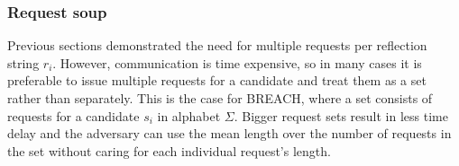 \subsubsection{Request soup}
Previous sections demonstrated the need for multiple requests per reflection
string $r_i$. However, communication is time expensive, so in many cases it is
preferable to issue multiple requests for a candidate and treat them as a set
rather than separately. This is the case for BREACH, where a set consists of
requests for a candidate $s_i$ in alphabet $\Sigma$. Bigger request sets result
in less time delay and the adversary can use the mean length over the number of
requests in the set without caring for each individual request's length.
